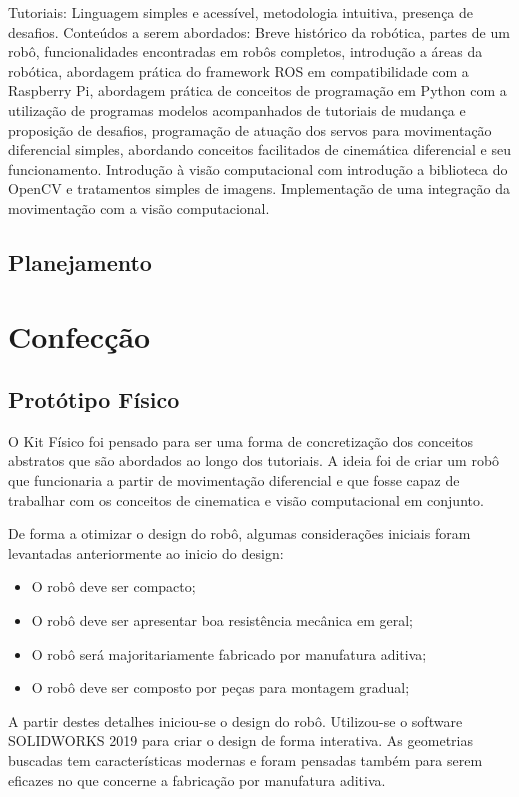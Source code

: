 Tutoriais: Linguagem simples e acessível, metodologia intuitiva, presença de desafios.
Conteúdos a serem abordados: Breve histórico da robótica, partes de um robô, funcionalidades encontradas em robôs completos, introdução a áreas da robótica, abordagem prática do framework ROS em compatibilidade com a Raspberry Pi, abordagem prática de conceitos de programação em Python com a utilização de programas modelos acompanhados de tutoriais de mudança e proposição de desafios,
programação de atuação dos servos para movimentação diferencial simples, abordando conceitos facilitados de cinemática diferencial e seu funcionamento. Introdução à visão computacional com introdução a biblioteca do OpenCV e tratamentos simples de imagens.
Implementação de uma integração da movimentação com a visão computacional.
\subsection{Planejamento}

\section{Confecção}
\subsection{Protótipo Físico}
O Kit Físico foi pensado para ser uma forma de concretização dos conceitos abstratos que são abordados ao longo dos tutoriais. A ideia foi de criar um robô que funcionaria a partir de movimentação diferencial e que fosse capaz de trabalhar com os conceitos de cinematica e visão computacional em conjunto.

De forma a otimizar o design do robô, algumas considerações iniciais foram levantadas anteriormente ao inicio do design:

\begin{itemize}
	\item O robô deve ser compacto;
	\item O robô deve ser apresentar boa resistência mecânica em geral;
	\item O robô será majoritariamente fabricado por manufatura aditiva;
	\item O robô deve ser composto por peças para montagem gradual;
\end{itemize}
A partir destes detalhes iniciou-se o design do robô. Utilizou-se o software SOLIDWORKS 2019 para criar o design de forma interativa. As geometrias buscadas tem características modernas e foram pensadas também para serem eficazes no que concerne a fabricação por manufatura aditiva.

